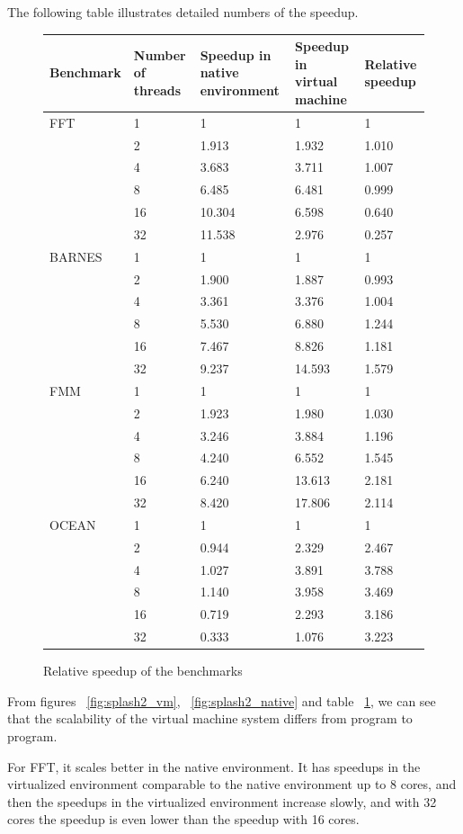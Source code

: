 The following table illustrates detailed numbers of the speedup.
\begin{figure}[here]
	\center
	\begin{tabular}{ l | p{2cm} | p{3cm} | p{3cm} | l }
		Benchmark & Number of threads & Speedup in native environment & Speedup in virtual machine & Relative speedup \\
	\hline
FFT & 1 &	1	&	1	&	1	\\
	&	2	&	1.913	&	1.932	&	1.010	\\
	&	4	&	3.683	&	3.711	&	1.007	\\
	&	8	&	6.485	&	6.481	&	0.999	\\
	&	16	&	10.304	&	6.598	&	0.640	\\
	&	32	&	11.538	&	2.976	&	0.257	\\
	\hline
BARNES	&	1	&	1	&	1	&	1	\\
	&	2	&	1.900	&	1.887	&	0.993	\\
	&	4	&	3.361	&	3.376	&	1.004	\\
	&	8	&	5.530	&	6.880	&	1.244	\\
	&	16	&	7.467	&	8.826	&	1.181	\\
	&	32	&	9.237	&	14.593	&	1.579	\\
	\hline
FMM	&	1	&	1	&	1	&	1	\\
	&	2	&	1.923	&	1.980	&	1.030	\\
	&	4	&	3.246	&	3.884	&	1.196	\\
	&	8	&	4.240	&	6.552	&	1.545	\\
	&	16	&	6.240	&	13.613	&	2.181	\\
	&	32	&	8.420	&	17.806	&	2.114	\\
	\hline
OCEAN	&	1	&	1	&	1	&	1	\\
	&	2	&	0.944	&	2.329	&	2.467	\\
	&	4	&	1.027	&	3.891	&	3.788	\\
	&	8	&	1.140	&	3.958	&	3.469	\\
	&	16	&	0.719	&	2.293	&	3.186	\\
	&	32	&	0.333	&	1.076	&	3.223	\\
\end{tabular}
\caption{Relative speedup of the benchmarks}
\label{fig:relspeedup}
\end{figure}

From figures ~\ref{fig:splash2_vm}, ~\ref{fig:splash2_native} and
table ~\ref{fig:relspeedup}, 
we can see that the scalability of the virtual machine system differs from
program to program.

For FFT, it scales better in the native environment. It has speedups 
in the virtualized environment comparable to the native environment up to
8 cores, and then the speedups in the virtualized environment increase
slowly, and with 32 cores the speedup is even lower than the speedup
with 16 cores.

